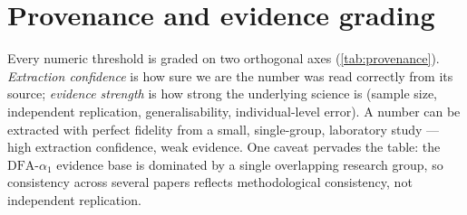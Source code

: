\documentclass[11pt]{article}
\newcommand{\aone}{\ensuremath{\text{DFA-}\alpha_1}}
\begin{document}
\section{Provenance and evidence grading}\label{sec:provenance}

Every numeric threshold is graded on two orthogonal axes (\autoref{tab:provenance}). \emph{Extraction confidence} is how sure we are the number was read correctly from its source; \emph{evidence strength} is how strong the underlying science is (sample size, independent replication, generalisability, individual-level error). A number can be extracted with perfect fidelity from a small, single-group, laboratory study --- high extraction confidence, weak evidence. One caveat pervades the table: the $\aone$ evidence base is dominated by a single overlapping research group, so consistency across several papers reflects methodological consistency, not independent replication.
\end{document}
